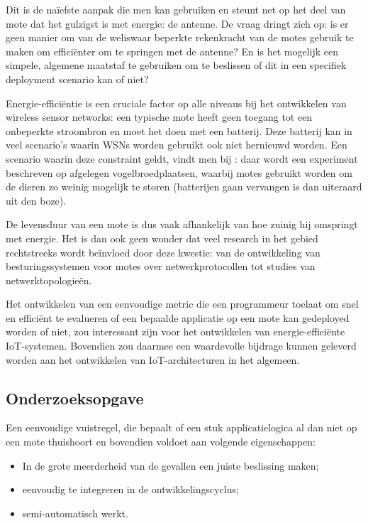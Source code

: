 \documentclass[11pt]{article}
\begin{document}
Dit is de na\"iefste aanpak die men kan gebruiken en steunt net op het deel van
mote dat het gulzigst is met energie: de antenne.  De vraag dringt zich op: is
er geen manier om van de weliswaar beperkte rekenkracht van de motes gebruik te
maken om effici\"enter om te springen met de antenne? En is het mogelijk een
simpele, algemene maatstaf te gebruiken om te beslissen of dit in een specifiek
deployment scenario kan of niet?

Energie-effici\"entie is een cruciale factor op alle niveaus bij het ontwikkelen
van wireless sensor networks: een typische mote heeft geen toegang tot een
onbeperkte stroombron en moet het doen met een batterij. Deze batterij kan in
veel scenario's waarin WSNs worden gebruikt ook niet hernieuwd worden. Een
scenario waarin deze constraint geldt, vindt men bij
\cite{mainwaring2002wireless}: daar wordt een experiment beschreven op afgelegen
vogelbroedplaatsen, waarbij motes gebruikt worden om de dieren zo weinig
mogelijk te storen (batterijen gaan vervangen is dan uiteraard uit den boze).

De levensduur van een mote is dus vaak afhankelijk van hoe zuinig hij
omspringt met energie. Het is dan ook geen wonder dat veel research in het
gebied rechtstreeks wordt be\"invloed door deze kwestie: van de ontwikkeling van
besturingssystemen voor motes over netwerkprotocollen tot studies van
netwerktopologie\"en.

Het ontwikkelen van een eenvoudige metric die een programmeur toelaat om snel en
effici\"ent te evalueren of een bepaalde applicatie op een mote kan gedeployed
worden of niet, zou interessant zijn voor het ontwikkelen van
energie-effici\"ente IoT-systemen. Bovendien zou daarmee een waardevolle
bijdrage kunnen geleverd worden aan het ontwikkelen van IoT-architecturen in
het algemeen.

\subsection{Onderzoeksopgave}

Een eenvoudige vuistregel, die bepaalt of een stuk applicatielogica al dan niet op een mote thuishoort en bovendien voldoet aan volgende eigenschappen:
\begin{itemize}
\item In de grote meerderheid van de gevallen een juiste beslissing maken;
\item eenvoudig te integreren in de ontwikkelingscyclus;
\item semi-automatisch werkt.
\end{itemize}
\end{document}
